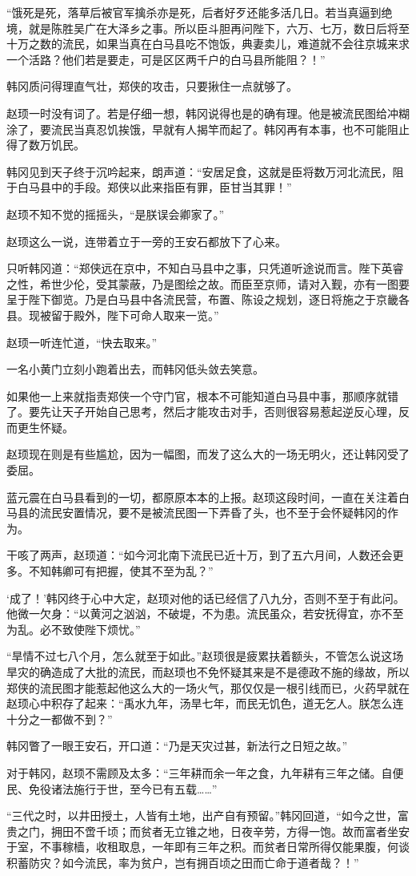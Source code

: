 “饿死是死，落草后被官军擒杀亦是死，后者好歹还能多活几日。若当真逼到绝境，就是陈胜吴广在大泽乡之事。所以臣斗胆再问陛下，六万、七万，数日后将至十万之数的流民，如果当真在白马县吃不饱饭，典妻卖儿，难道就不会往京城来求一个活路？他们若是要走，可是区区两千户的白马县所能阻？！”

韩冈质问得理直气壮，郑侠的攻击，只要揪住一点就够了。

赵顼一时没有词了。若是仔细一想，韩冈说得也是的确有理。他是被流民图给冲糊涂了，要流民当真忍饥挨饿，早就有人揭竿而起了。韩冈再有本事，也不可能阻止得了数万饥民。

韩冈见到天子终于沉吟起来，朗声道：“安居足食，这就是臣将数万河北流民，阻于白马县中的手段。郑侠以此来指臣有罪，臣甘当其罪！”

赵顼不知不觉的摇摇头，“是朕误会卿家了。”

赵顼这么一说，连带着立于一旁的王安石都放下了心来。

只听韩冈道：“郑侠远在京中，不知白马县中之事，只凭道听途说而言。陛下英睿之性，希世少伦，受其蒙蔽，乃是图绘之故。而臣至京师，请对入觐，亦有一图要呈于陛下御览。乃是白马县中各流民营，布置、陈设之规划，逐日将施之于京畿各县。现被留于殿外，陛下可命人取来一览。”

赵顼一听连忙道，“快去取来。”

一名小黄门立刻小跑着出去，而韩冈低头敛去笑意。

如果他一上来就指责郑侠一个守门官，根本不可能知道白马县中事，那顺序就错了。要先让天子开始自己思考，然后才能攻击对手，否则很容易惹起逆反心理，反而更生怀疑。

赵顼现在则是有些尴尬，因为一幅图，而发了这么大的一场无明火，还让韩冈受了委屈。

蓝元震在白马县看到的一切，都原原本本的上报。赵顼这段时间，一直在关注着白马县的流民安置情况，要不是被流民图一下弄昏了头，也不至于会怀疑韩冈的作为。

干咳了两声，赵顼道：“如今河北南下流民已近十万，到了五六月间，人数还会更多。不知韩卿可有把握，使其不至为乱？”

‘成了！’韩冈终于心中大定，赵顼对他的话已经信了八九分，否则不至于有此问。他微一欠身：“以黄河之汹汹，不破堤，不为患。流民虽众，若安抚得宜，亦不至为乱。必不致使陛下烦忧。”

“旱情不过七八个月，怎么就至于如此。”赵顼很是疲累扶着额头，不管怎么说这场旱灾的确造成了大批的流民，而赵顼也不免怀疑其来是不是德政不施的缘故，所以郑侠的流民图才能惹起他这么大的一场火气，那仅仅是一根引线而已，火药早就在赵顼心中积存了起来：“禹水九年，汤旱七年，而民无饥色，道无乞人。朕怎么连十分之一都做不到？”

韩冈瞥了一眼王安石，开口道：“乃是天灾过甚，新法行之日短之故。”

对于韩冈，赵顼不需顾及太多：“三年耕而余一年之食，九年耕有三年之储。自便民、免役诸法施行于世，至今已有五载……”

“三代之时，以井田授土，人皆有土地，出产自有预留。”韩冈回道，“如今之世，富贵之门，拥田不啻千顷；而贫者无立锥之地，日夜辛劳，方得一饱。故而富者坐安于室，不事稼樯，收租取息，一年即有三年之积。而贫者日常所得仅能果腹，何谈积蓄防灾？如今流民，率为贫户，岂有拥百顷之田而亡命于道者哉？！”

